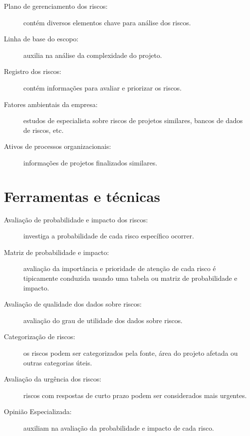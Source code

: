 \begin{description}
	\item[Plano de gerenciamento dos riscos:] contém diversos elementos chave para análise dos riscos.
	
	\item[Linha de base do escopo:] auxilia na análise da complexidade do projeto.
	
	\item[Registro dos riscos:] contém informações para avaliar e priorizar os riscos.
	
	\item[Fatores ambientais da empresa:] estudos de especialista sobre riscos de projetos similares, bancos de dados de riscos, etc.
	
	\item[Ativos de processos organizacionais:] informações de projetos finalizados similares.

\end{description}

\section{Ferramentas e técnicas}

\begin{description}
		\item[Avaliação de probabilidade e impacto dos riscos:] investiga a probabilidade de cada risco específico ocorrer.
		
		\item[Matriz de probabilidade e impacto:] avaliação da importância e prioridade de atenção de cada risco é tipicamente conduzida usando uma tabela ou matriz de probabilidade e impacto.
		
		\item[Avaliação de qualidade dos dados sobre riscos:] avaliação do grau de utilidade dos dados sobre riscos.
		
		\item[Categorização de riscos:] os riscos podem ser categorizados pela fonte, área do projeto afetada ou outras categorias úteis.
		
		\item[Avaliação da urgência dos riscos:] riscos com respostas de curto prazo podem ser considerados mais urgentes.
		
		\item[Opinião Especializada:] auxiliam na avaliação da probabilidade  e impacto de cada risco.
		
\end{description}

